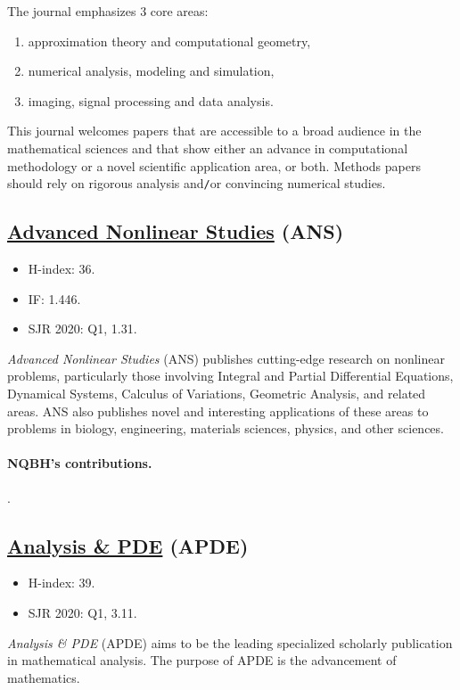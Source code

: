 \documentclass{article}
\numberwithin{equation}{section}
\begin{document}
The journal emphasizes 3 core areas:
\begin{enumerate}
	\item approximation theory and computational geometry,
	\item numerical analysis, modeling and simulation,
	\item imaging, signal processing and data analysis.
\end{enumerate}
This journal welcomes papers that are accessible to a broad audience in the mathematical sciences and that show either an advance in computational methodology or a novel scientific application area, or both. Methods papers should rely on rigorous analysis and\texttt{/}or convincing numerical studies.

\subsection{\href{https://www.degruyter.com/journal/key/ans/html}{Advanced Nonlinear Studies} (ANS)}
\begin{itemize}
	\item H-index: 36.
	\item IF: 1.446.
	\item SJR 2020: Q1, 1.31.
\end{itemize}
\textit{Advanced Nonlinear Studies} (ANS) publishes cutting-edge research on nonlinear problems, particularly those involving Integral and Partial Differential Equations, Dynamical Systems, Calculus of Variations, Geometric Analysis, and related areas. ANS also publishes novel and interesting applications of these areas to problems in biology, engineering, materials sciences, physics, and other sciences.

\paragraph{NQBH's contributions.} \cite{Dao_Diaz_Nguyen2020}.

\subsection{\href{https://msp.org/apde}{Analysis \& PDE} (APDE)}
\begin{itemize}
	\item H-index: 39.
	\item SJR 2020: Q1, 3.11.
\end{itemize}
\textit{Analysis \& PDE} (APDE) aims to be the leading specialized scholarly publication in mathematical analysis. The purpose of APDE is the advancement of mathematics.
\end{document}
